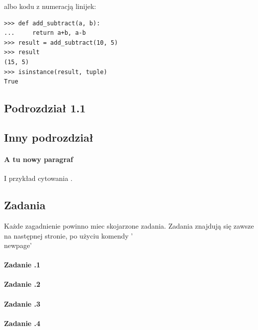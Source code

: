 \documentclass[a4paper]{article}
\begin{document}
albo kodu z numeracją linijek:

\begin{verbatim}
>>> def add_subtract(a, b):
...     return a+b, a-b
>>> result = add_subtract(10, 5)
>>> result
(15, 5)
>>> isinstance(result, tuple)
True
\end{verbatim}


\subsection{Podrozdział 1.1}

\subsection{Inny podrozdział}

\paragraph{A tu nowy paragraf} I przykład cytowania \cite{classes}.


\newpage
\subsection{Zadania} Każde zagadnienie powinno miec skojarzone zadania. Zadania znajdują się zawsze na następnej stronie, po użyciu komendy '\\newpage'

\paragraph{Zadanie \thesection.1}

\paragraph{Zadanie \thesection.2}

\paragraph{Zadanie \thesection.3}

\paragraph{Zadanie \thesection.4}

\newpage


\newpage






\begin{verbatim}

\end{verbatim}
\end{document}
